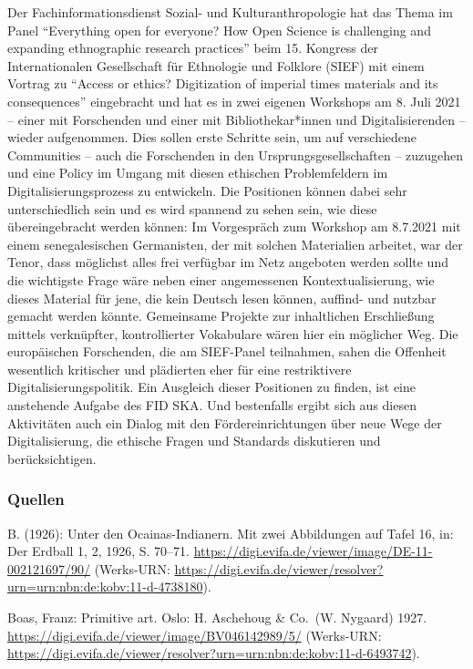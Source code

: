 \documentclass[a4paper,
fontsize=11pt,
oneside,
numbers=noperiodatend,
parskip=half-,
bibliography=totoc,
final
]{scrartcl}
\begin{document}
Der Fachinformationsdienst Sozial- und Kulturanthropologie hat das Thema
im Panel \enquote{Everything open for everyone? How Open Science is
challenging and expanding ethnographic research practices} beim 15.
Kongress der Internationalen Gesellschaft für Ethnologie und Folklore
(SIEF) mit einem Vortrag zu \enquote{Access or ethics? Digitization of
imperial times materials and its consequences} eingebracht und hat es in
zwei eigenen Workshops am 8. Juli 2021 -- einer mit Forschenden und
einer mit Bibliothekar*innen und Digitalisierenden -- wieder
aufgenommen. Dies sollen erste Schritte sein, um auf verschiedene
Communities -- auch die Forschenden in den Ursprungsgesellschaften --
zuzugehen und eine Policy im Umgang mit diesen ethischen Problemfeldern
im Digitalisierungsprozess zu entwickeln. Die Positionen können dabei
sehr unterschiedlich sein und es wird spannend zu sehen sein, wie diese
übereingebracht werden können: Im Vorgespräch zum Workshop am 8.7.2021
mit einem senegalesischen Germanisten, der mit solchen Materialien
arbeitet, war der Tenor, dass möglichst alles frei verfügbar im Netz
angeboten werden sollte und die wichtigste Frage wäre neben einer
angemessenen Kontextualisierung, wie dieses Material für jene, die kein
Deutsch lesen können, auffind- und nutzbar gemacht werden könnte.
Gemeinsame Projekte zur inhaltlichen Erschließung mittels verknüpfter,
kontrollierter Vokabulare wären hier ein möglicher Weg. Die europäischen
Forschenden, die am SIEF-Panel teilnahmen, sahen die Offenheit
wesentlich kritischer und plädierten eher für eine restriktivere
Digitalisierungspolitik. Ein Ausgleich dieser Positionen zu finden, ist
eine anstehende Aufgabe des FID SKA. Und bestenfalls ergibt sich aus
diesen Aktivitäten auch ein Dialog mit den Fördereinrichtungen über neue
Wege der Digitalisierung, die ethische Fragen und Standards diskutieren
und berücksichtigen.

\hypertarget{quellen}{%
\subsubsection{Quellen}\label{quellen}}

B. (1926): Unter den Ocainas-Indianern. Mit zwei Abbildungen auf Tafel
16, in: Der Erdball 1, 2, 1926, S. 70--71.
\url{https://digi.evifa.de/viewer/image/DE-11-002121697/90/} (Werks-URN:
\url{https://digi.evifa.de/viewer/resolver?urn=urn:nbn:de:kobv:11-d-4738180}).

Boas, Franz: Primitive art. Oslo: H. Aschehoug \& Co.~(W. Nygaard) 1927.
\url{https://digi.evifa.de/viewer/image/BV046142989/5/} (Werks-URN:
\url{https://digi.evifa.de/viewer/resolver?urn=urn:nbn:de:kobv:11-d-6493742}).
\end{document}

